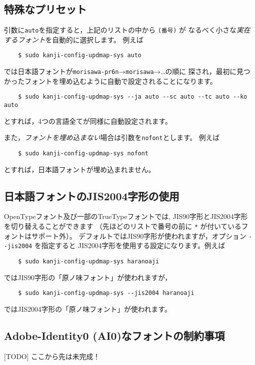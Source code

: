 \documentclass{jlreq}
\def\command#1{\texttt{#1}}
\def\option#1{\texttt{-{}-#1}}
\begin{document}
\subsection{特殊なプリセット}

引数に\command{auto}を指定すると，上記のリストの中から \command{(番号)} が
なるべく小さな\emph{実在するフォント}を自動的に選択します。
例えば
\begin{verbatim}
    $ sudo kanji-config-updmap-sys auto
\end{verbatim}
では日本語フォントが\command{morisawa-pr6n}→\command{morisawa}→…の順に
探され，最初に見つかったフォントを埋め込むように自動で設定されることになります。
\begin{verbatim}
    $ sudo kanji-config-updmap-sys --ja auto --sc auto --tc auto --ko auto
\end{verbatim}
とすれば，4つの言語全てが同様に自動設定されます。

また，\emph{フォントを埋め込まない}場合は引数を\command{nofont}とします。
例えば
\begin{verbatim}
    $ sudo kanji-config-updmap-sys nofont
\end{verbatim}
とすれば，日本語フォントが埋め込まれません。

\subsection{日本語フォントのJIS2004字形の使用}\label{jis2004}

OpenTypeフォント及び一部のTrueTypeフォントでは,
JIS90字形とJIS2004字形を切り替えることができます
（先ほどのリストで番号の前に \command{*} が付いているフォントはサポート外）。
デフォルトではJIS90字形が使われますが，オプション \option{jis2004} を指定すると
JIS2004字形を使用する設定になります。例えば
\begin{verbatim}
    $ sudo kanji-config-updmap-sys haranoaji
\end{verbatim}
ではJIS90字形の「原ノ味フォント」が使われますが，
\begin{verbatim}
    $ sudo kanji-config-updmap-sys --jis2004 haranoaji
\end{verbatim}
ではJIS2004字形の「原ノ味フォント」が使われます。

\subsection{Adobe-Identity0 (AI0)なフォントの制約事項}

[TODO] ここから先は未完成！
\end{document}
